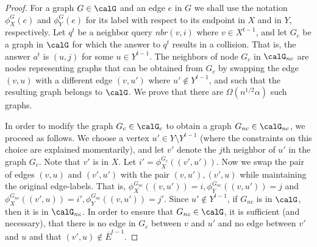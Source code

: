 \begin{proof}

For a graph $G\in \calG$ and an edge $e$ in $G$ we shall use the notation $\phi^{G}_X(e)$
and $\phi^G_Y(e)$ for its label with respect to its endpoint in $X$ and in $Y$, respectively.
Let $q^t$ be a neighbor query $nbr(v,i)$ where %
$v\in X^{t-1}$, 
and let $G_{c}$ be a graph in $\calG$ for which the answer to $q^t$ results in a collision. That is,  the answer $a^t$ is $(u,j)$ for some $u\in Y^{t-1}$.
The neighbors of node $G_{c}$ in $\calG_{nc}$ are nodes representing graphs that can be obtained from $G_{c}$ by swapping the edge $(v,u)$ with a different edge $(v, u')$ where $u'\notin Y^{t-1}$, and  %
such that the resulting graph belongs to $\calG$.
We prove that there are $\Omega(n^{1/2}\alpha)$ such graphs.

In order to modify the graph $G_c \in \calG_c$ to obtain a graph $G_{nc} \in \calG_{nc}$, we proceed as follows.
    We choose a vertex %
    $u'\in Y\setminus Y^{t-1}$ (where the constraints on this choice are explained momentarily), and let $v'$ denote the $j$th neighbor of $u'$ in the graph $G_{c}$. Note that $v'$ is in $X$. Let $i'=\phi^{G_c}_X((v',u'))$. Now we swap the pair of  edges $(v,u)$
    and $(v',u')$   with the pair  $(v,u'), (v',u)$  while maintaining the original edge-labels. That is, $\phi^{G_{nc}}_X((v,u'))=i, \phi^{G_{nc}}_Y((v,u'))=j$ and $\phi^{G_{nc}}_X((v',u))=i', \phi^{G_{nc}}_Y((v,u'))=j'$.
    Since $u' \notin Y^{t-1}$, if $G_{nc}$ is in $\calG$, then it is in $\calG_{nc}$. In order to ensure that $G_{nc}\in\calG$, it is sufficient (and necessary), that there is no edge in $G_c$ between $v$ and $u'$ and no edge between $v'$ and $u$ and that
    $(v',u)\notin \overline{E}^{t-1}$.

\end{proof}
